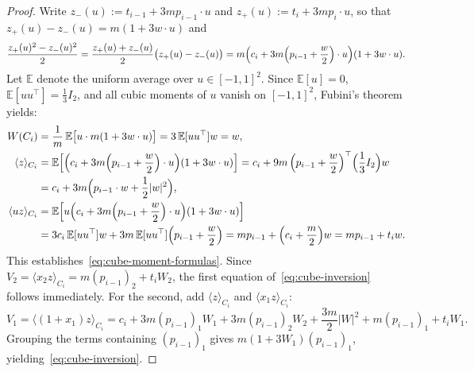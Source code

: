 \documentclass[11pt,a4paper]{amsart}
\numberwithin{equation}{section}
\theoremstyle{definition}
\newcommand{\avg}[2]{\langle #1 \rangle_{#2}}
\begin{document}
\begin{proof}
Write $z_-(u) := t_{i-1} + 3m p_{i-1} \cdot u$ and $z_+(u) := t_i + 3m p_i \cdot u$, so that $z_+(u) - z_-(u) = m(1 + 3 w \cdot u)$ and
\[
\frac{z_+(u)^2 - z_-(u)^2}{2} = \frac{z_+(u) + z_-(u)}{2} \bigl(z_+(u) - z_-(u)\bigr)
= m \Bigl(c_i + 3m \Bigl(p_{i-1} + \frac{w}{2}\Bigr) \cdot u\Bigr) (1 + 3 w \cdot u).
\]
Let $\mathbb{E}$ denote the uniform average over $u \in [-1,1]^2$. Since $\mathbb{E}[u] = 0$, $\mathbb{E}[u u^\top] = \frac{1}{3} I_2$, and all cubic moments of $u$ vanish on $[-1,1]^2$, Fubini's theorem yields:
\begin{align*}
W(C_i) &= \frac{1}{m}\, \mathbb{E}\bigl[u \cdot m(1 + 3 w \cdot u)\bigr] = 3\, \mathbb{E}[u u^\top] w = w, \\
\avg{z}{C_i} &= \mathbb{E}\Bigl[\Bigl(c_i + 3m\Bigl(p_{i-1} + \frac{w}{2}\Bigr)\cdot u\Bigr)(1 + 3 w \cdot u)\Bigr]
= c_i + 9m\, \Bigl(p_{i-1} + \frac{w}{2}\Bigr)^\top \Bigl(\frac{1}{3} I_2\Bigr) w \\
&= c_i + 3m\Bigl(p_{i-1} \cdot w + \frac{1}{2}|w|^2\Bigr), \\
\avg{u z}{C_i} &= \mathbb{E}\Bigl[u\Bigl(c_i + 3m\Bigl(p_{i-1} + \frac{w}{2}\Bigr)\cdot u\Bigr)(1 + 3 w \cdot u)\Bigr] \\
&= 3 c_i\, \mathbb{E}[u u^\top] w + 3m\, \mathbb{E}[u u^\top]\Bigl(p_{i-1} + \frac{w}{2}\Bigr)
= m p_{i-1} + \Bigl(c_i + \frac{m}{2}\Bigr) w = m p_{i-1} + t_i w.
\end{align*}
This establishes~\eqref{eq:cube-moment-formulas}. Since $V_2 = \avg{x_2 z}{C_i} = m(p_{i-1})_2 + t_i W_2$, the first equation of~\eqref{eq:cube-inversion} follows immediately. For the second, add $\avg{z}{C_i}$ and $\avg{x_1 z}{C_i}$:
\[
V_1 = \avg{(1+x_1)z}{C_i} = c_i + 3m(p_{i-1})_1 W_1 + 3m(p_{i-1})_2 W_2 + \frac{3m}{2}|W|^2 + m(p_{i-1})_1 + t_i W_1.
\]
Grouping the terms containing $(p_{i-1})_1$ gives $m(1 + 3W_1)(p_{i-1})_1$, yielding~\eqref{eq:cube-inversion}.
\end{proof}
\end{document}
